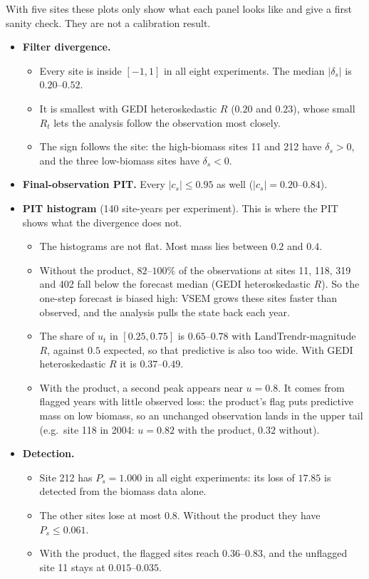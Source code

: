 \documentclass[11pt]{article}
\begin{document}
With five sites these plots only show what each panel looks like and give a first
sanity check. They are not a calibration result.

\begin{itemize}
  \item \textbf{Filter divergence.}
  \begin{itemize}
    \item Every site is inside $[-1, 1]$ in all eight experiments. The median
    $|\delta_s|$ is $0.20$--$0.52$.
    \item It is smallest with GEDI heteroskedastic $R$ ($0.20$ and $0.23$), whose small
    $R_t$ lets the analysis follow the observation most closely.
    \item The sign follows the site: the high-biomass sites 11 and 212 have
    $\delta_s > 0$, and the three low-biomass sites have $\delta_s < 0$.
  \end{itemize}
  \item \textbf{Final-observation PIT.} Every $|c_s| \le 0.95$ as well
  ($|c_s| = 0.20$--$0.84$).
  \item \textbf{PIT histogram} (140 site-years per experiment). This is where the PIT
  shows what the divergence does not.
  \begin{itemize}
    \item The histograms are not flat. Most mass lies between $0.2$ and $0.4$.
    \item Without the product, $82$--$100\%$ of the observations at sites 11, 118, 319 and
    402 fall below the forecast median (GEDI heteroskedastic $R$). So the one-step
    forecast is biased high: VSEM grows these sites faster than observed, and the analysis
    pulls the state back each year.
    \item The share of $u_t$ in $[0.25, 0.75]$ is $0.65$--$0.78$ with LandTrendr-magnitude
    $R$, against $0.5$ expected, so that predictive is also too wide. With GEDI
    heteroskedastic $R$ it is $0.37$--$0.49$.
    \item With the product, a second peak appears near $u = 0.8$. It comes from flagged
    years with little observed loss: the product's flag puts predictive mass on low
    biomass, so an unchanged observation lands in the upper tail (e.g.\ site 118 in 2004:
    $u = 0.82$ with the product, $0.32$ without).
  \end{itemize}
  \item \textbf{Detection.}
  \begin{itemize}
    \item Site 212 has $P_s = 1.000$ in all eight experiments: its loss of $17.85$ is
    detected from the biomass data alone.
    \item The other sites lose at most $0.8$. Without the product they have
    $P_s \le 0.061$.
    \item With the product, the flagged sites reach $0.36$--$0.83$, and the unflagged
    site 11 stays at $0.015$--$0.035$.
  \end{itemize}
\end{itemize}
\end{document}
